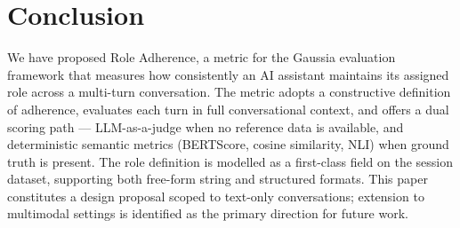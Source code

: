 \documentclass[11pt,a4paper]{article}
\begin{document}
\section{Conclusion}

We have proposed Role Adherence, a metric for the Gaussia evaluation framework
that measures how consistently an AI assistant maintains its assigned role
across a multi-turn conversation. The metric adopts a constructive definition
of adherence, evaluates each turn in full conversational context, and offers a
dual scoring path --- LLM-as-a-judge when no reference data is available, and
deterministic semantic metrics (BERTScore, cosine similarity, NLI) when ground
truth is present. The role definition is modelled as a first-class field on the
session dataset, supporting both free-form string and structured formats. This
paper constitutes a design proposal scoped to text-only conversations; extension
to multimodal settings is identified as the primary direction for future work.



\end{document}
